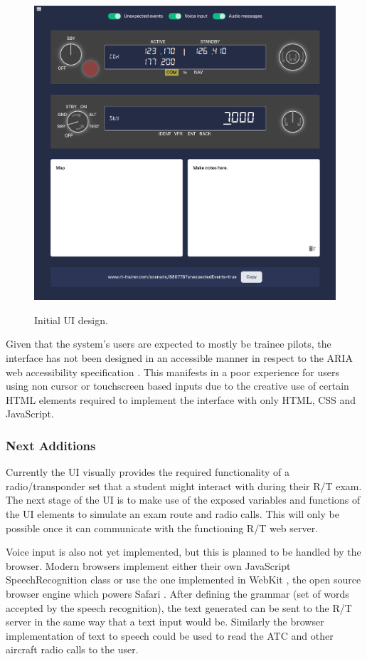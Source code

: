 \begin{figure}[H]
    \centering
	\includegraphics[scale = 0.47]{../document-resources/images/Project-Initial-UI.png}
    \label{initialui}
    \caption{Initial UI design.}
\end{figure}

Given that the system's users are expected to mostly be trainee pilots, the interface has not been designed in an accessible manner in respect to the ARIA web accessibility specification \cite{ARIA}. This manifests in a poor experience for users using non cursor or touchscreen based inputs due to the creative use of certain HTML elements required to implement the interface with only HTML, CSS and JavaScript.

\subsubsection{Next Additions}
Currently the UI visually provides the required functionality of a radio/transponder set that a student might interact with during their R/T exam. The next stage of the UI is to make use of the exposed variables and functions of the UI elements to simulate an exam route and radio calls. This will only be possible once it can communicate with the functioning R/T web server.

Voice input is also not yet implemented, but this is planned to be handled by the browser. Modern browsers implement either their own JavaScript SpeechRecognition class or use the one implemented in WebKit \cite{MDNWebSpeech}, the open source browser engine which powers Safari \cite{WebKit}. After defining the grammar (set of words accepted by the speech recognition), the text generated can be sent to the R/T server in the same way that a text input would be. Similarly the browser implementation of text to speech could be used to read the ATC and other aircraft radio calls to the user.


